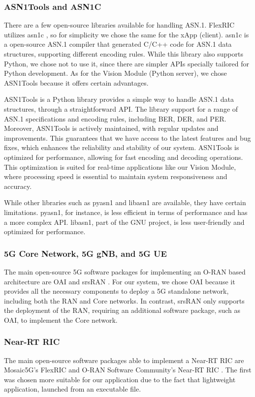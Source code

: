 \subsubsection{ASN1Tools and ASN1C}
There are a few open-source libraries available for handling ASN.1.
FlexRIC utilizes asn1c \cite{}, so for simplicity we chose the same for the xApp (client).
asn1c \cite[asn1c]{} is a open-source ASN.1 compiler that generated C/C++ code for ASN.1 data structures, supporting different encoding rules.
While this library also supports Python, we chose not to use it, since there are simpler APIs specially tailored for Python development.
As for the Vision Module (Python server), we chose ASN1Tools because it offers certain advantages.

ASN1Tools is a Python library provides a simple way to handle ASN.1 data structures, through a straightforward API\@.
The library support for a range of ASN.1 specifications and encoding rules, including BER, DER, and PER\@.
Moreover, ASN1Tools is actively maintained, with regular updates and improvements.
This guarantees that we have access to the latest features and bug fixes, which enhances the reliability and stability of our system.
ASN1Tools is optimized for performance, allowing for fast encoding and decoding operations.
This optimization is suited for real-time applications like our Vision Module, where processing speed is essential to maintain system responsiveness and accuracy.

While other libraries such as pyasn1 and libasn1 are available, they have certain limitations.
pyasn1, for instance, is less efficient in terms of performance and has a more complex API\@.
libasn1, part of the GNU project, is less user-friendly and optimized for performance.

\subsubsection{5G Core Network, 5G gNB, and 5G UE}
The main open-source 5G software packages for implementing an O-RAN based architecture are OAI \cite[]{} and srsRAN \cite[]{}.
For our system, we chose OAI because it provides all the necessary components to deploy a 5G standalone network, including both the RAN and Core networks.
In contrast, srsRAN only supports the deployment of the RAN, requiring an additional software package, such as OAI, to implement the Core network.

\subsubsection{Near-RT RIC}
The main open-source software packages able to implement a Near-RT RIC are Mosaic5G’s FlexRIC \cite[]{} and  O-RAN Software Community’s Near-RT RIC \cite[]{}.
The first was chosen more suitable for our application due to the fact that lightweight application, launched from an executable file.

